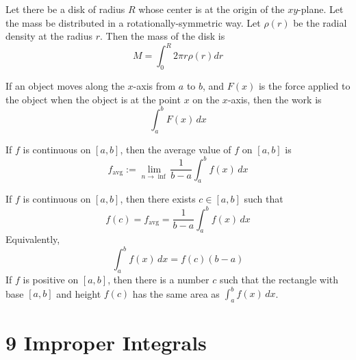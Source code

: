 \begin{theorem}
  Let there be a disk of radius $R$ whose center is at the origin of the $xy$-plane. Let the mass be distributed in a rotationally-symmetric way. Let $\rho(r)$ be the radial density at the radius $r$. Then the mass of the disk is 
  \[
    M = \int_0^R 2\pi r \rho(r) dr
  \]
\end{theorem}

\begin{theorem}[Work]
  If an object moves along the $x$-axis from $a$ to $b$, and $F(x)$ is the force applied to the object when the object is at the point $x$ on the $x$-axis, then the work is
  \[
    \int_a^b F(x) \,dx
  \]
\end{theorem}

\begin{definition}
  If $f$ is continuous on $[a, b]$, then the average value of $f$ on $[a, b]$ is
  \[
    f_{\text{avg}} := \lim_{n \to \inf} \frac{1}{b - a} \int_a^b f(x) \,dx
  \]
\end{definition}

\begin{theorem}
  If $f$ is continuous on $[a, b]$, then there exists $c \in [a, b]$ such that
  \[
    f(c) = f_{\text{avg}} = \frac{1}{b-a} \int_a^b f(x) \,dx
  \]
  Equivalently,
  \[
    \int_a^b f(x) \,dx = f(c)(b - a)
  \]
  If $f$ is positive on $[a, b]$, then there is a number $c$ such that the rectangle with base $[a, b]$ and height $f(c)$ has the same area as $\int_a^b f(x) \,dx$.
\end{theorem}

\section*{9 Improper Integrals}

